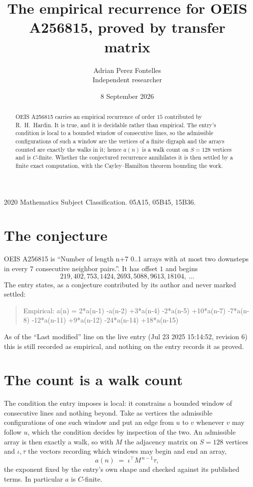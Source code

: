 \documentclass[11pt,a4paper]{article}
\title{The empirical recurrence for OEIS A256815, proved by transfer matrix}
\author{Adrian Perez Fontelles\\ \small Independent researcher}
\date{8 September 2026}
\theoremstyle{plain}
\theoremstyle{definition}
\begin{document}
\maketitle

\begin{abstract}
OEIS A256815 carries an empirical recurrence of order $15$ contributed by R.~H.~Hardin. It is
true, and it is decidable rather than empirical. The entry's condition is local to a bounded window of consecutive lines, so
the admissible configurations of such a window are the vertices of a finite digraph and the
arrays counted are exactly the walks in it; hence $a(n)$ is a walk count on $S=128$ vertices
and is $C$-finite. Whether the conjectured recurrence annihilates it is then settled by a
finite exact computation, with the Cayley--Hamilton theorem bounding the work.
\end{abstract}

\noindent\small 2020 Mathematics Subject Classification. 05A15, 05B45, 15B36.\normalsize

\section{The conjecture}

OEIS A256815 is ``Number of length n+7 0..1 arrays with at most two downsteps in every 7 consecutive neighbor pairs.''. It has offset $1$ and begins
\[
219, 402, 753, 1424, 2693, 5088, 9613, 18104,\ \dots
\]
The entry states, as a conjecture contributed by its author and never marked settled:
\begin{quote}
Empirical: a(n) = 2*a(n-1) -a(n-2) +3*a(n-4) -2*a(n-5) +10*a(n-7) -7*a(n-8) -12*a(n-11) +9*a(n-12) -24*a(n-14) +18*a(n-15)
\end{quote}
As of the ``Last modified'' line on the live entry (Jul 23 2025 15:14:52, revision 6) this is still
recorded as empirical, and nothing on the entry records it as proved.

\section{The count is a walk count}

The condition the entry imposes is local: it constrains a bounded window of consecutive lines and nothing beyond. Take as
vertices the admissible configurations of one such window and put an edge from $u$ to $v$
whenever $v$ may follow $u$, which the condition decides by inspection of the two. An
admissible array is then exactly a walk, so with $M$ the adjacency matrix on $S=128$ vertices
and $\iota,\tau$ the vectors recording which windows may begin and end an array,
\[
a(n)\;=\;\iota^{\!\top}M^{\,n-1}\tau ,
\]
the exponent fixed by the entry's own shape and checked against its published terms. In
particular $a$ is $C$-finite.
\end{document}
